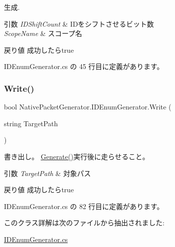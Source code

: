 生成. 


\begin{DoxyParams}{引数}
{\em I\+D\+Shift\+Count} & I\+Dをシフトさせるビット数\\
\hline
{\em Scope\+Name} & スコープ名\\
\hline
\end{DoxyParams}
\begin{DoxyReturn}{戻り値}
成功したらtrue
\end{DoxyReturn}


 I\+D\+Enum\+Generator.\+cs の 45 行目に定義があります。

\mbox{\label{classNativePacketGenerator_1_1IDEnumGenerator_ada5570f3f87cb3fcbb28ae02985b2dc9}} 
\subsubsection{\texorpdfstring{Write()}{Write()}}
{\footnotesize\ttfamily bool Native\+Packet\+Generator.\+I\+D\+Enum\+Generator.\+Write (\begin{DoxyParamCaption}\item[{string}]{Target\+Path }\end{DoxyParamCaption})}



書き出し。 \mbox{\hyperlink{classNativePacketGenerator_1_1IDEnumGenerator_a44b0dd37c3fc1a6661a4e949c2294cb9}{Generate()}}実行後に走らせること。 


\begin{DoxyParams}{引数}
{\em Target\+Path} & 対象パス\\
\hline
\end{DoxyParams}
\begin{DoxyReturn}{戻り値}
成功したらtrue
\end{DoxyReturn}


 I\+D\+Enum\+Generator.\+cs の 82 行目に定義があります。



このクラス詳解は次のファイルから抽出されました\+:\begin{DoxyCompactItemize}
\item 
\mbox{\hyperlink{IDEnumGenerator_8cs}{I\+D\+Enum\+Generator.\+cs}}\end{DoxyCompactItemize}
